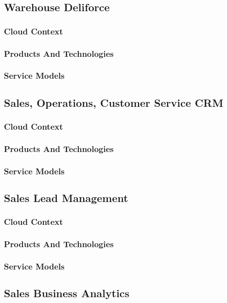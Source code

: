 \documentclass{llncs}
\begin{document}
\subsection{Warehouse Deliforce}
\subsubsection{Cloud Context}
\subsubsection{Products And Technologies}
\subsubsection{Service Models}

\subsection{Sales, Operations, Customer Service	CRM}
\subsubsection{Cloud Context}
\subsubsection{Products And Technologies}
\subsubsection{Service Models}

\subsection{Sales Lead Management}
\subsubsection{Cloud Context}
\subsubsection{Products And Technologies}
\subsubsection{Service Models}

\subsection{Sales Business Analytics}
\end{document}
